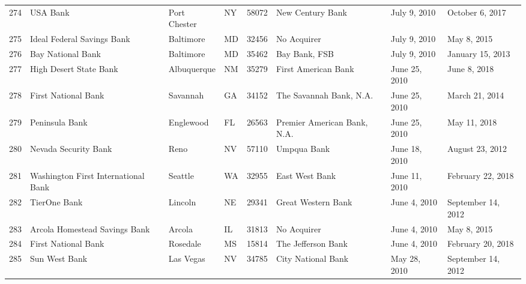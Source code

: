 \begin{tabular}{llllrlll}
274 &                                           USA Bank &        Port Chester &  NY &  58072 &                                   New Century Bank &        July 9, 2010 &     October 6, 2017 \\
275 &                         Ideal Federal Savings Bank &           Baltimore &  MD &  32456 &                                        No Acquirer &        July 9, 2010 &         May 8, 2015 \\
276 &                                  Bay National Bank &           Baltimore &  MD &  35462 &                                      Bay Bank, FSB &        July 9, 2010 &    January 15, 2013 \\
277 &                             High Desert State Bank &         Albuquerque &  NM &  35279 &                                First American Bank &       June 25, 2010 &        June 8, 2018 \\
278 &                                First National Bank &            Savannah &  GA &  34152 &                            The Savannah Bank, N.A. &       June 25, 2010 &      March 21, 2014 \\
279 &                                     Peninsula Bank &           Englewood &  FL &  26563 &                        Premier American Bank, N.A. &       June 25, 2010 &        May 11, 2018 \\
280 &                               Nevada Security Bank &                Reno &  NV &  57110 &                                        Umpqua Bank &       June 18, 2010 &     August 23, 2012 \\
281 &                Washington First International Bank &             Seattle &  WA &  32955 &                                     East West Bank &       June 11, 2010 &   February 22, 2018 \\
282 &                                       TierOne Bank &             Lincoln &  NE &  29341 &                                 Great Western Bank &        June 4, 2010 &  September 14, 2012 \\
283 &                      Arcola Homestead Savings Bank &              Arcola &  IL &  31813 &                                        No Acquirer &        June 4, 2010 &         May 8, 2015 \\
284 &                                First National Bank &            Rosedale &  MS &  15814 &                                 The Jefferson Bank &        June 4, 2010 &   February 20, 2018 \\
285 &                                      Sun West Bank &           Las Vegas &  NV &  34785 &                                 City National Bank &        May 28, 2010 &  September 14, 2012 \\

\end{tabular}
